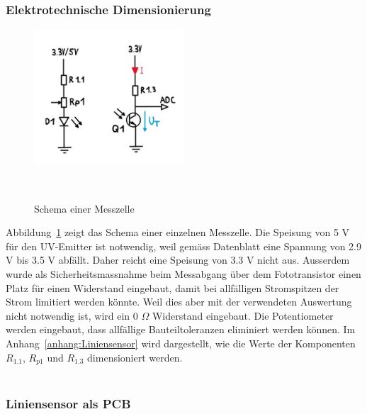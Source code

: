 \documentclass[main.tex]{subfiles} %
\begin{document}

\subsubsection{Elektrotechnische Dimensionierung}

\begin{figure}[H]
    \centering
    \includegraphics[width=0.5\textwidth]{fig_Strecke_Tracken/Schema_Messzelle_Liniensensor.pdf}
    \caption{Schema einer Messzelle}~\label{fig:Messzelle}
\end{figure}

Abbildung~\ref{fig:Messzelle} zeigt das Schema einer einzelnen Messzelle. Die Speisung von 5 V für 
den UV-Emitter ist notwendig, weil gemäss Datenblatt eine Spannung von 2.9 V bis 3.5 V abfällt. Daher reicht
eine Speisung von 3.3 V nicht aus. Ausserdem wurde als Sicherheitsmassnahme beim Messabgang über dem 
Fototransistor einen Platz für einen Widerstand eingebaut, damit bei allfälligen Stromspitzen der Strom 
limitiert werden könnte. Weil dies aber mit der verwendeten Auswertung nicht notwendig ist, wird ein
0 $\Omega$ Widerstand eingebaut. Die Potentiometer werden eingebaut, dass allfällige Bauteiltoleranzen
eliminiert werden können. Im Anhang~\ref{anhang:Liniensensor} wird dargestellt, wie die Werte der Komponenten $R_{1.1}$, $R_{p1}$ und $R_{1.3}$ 
dimensioniert werden.\\\\





\subsubsection{Liniensensor als PCB}
\end{document}
